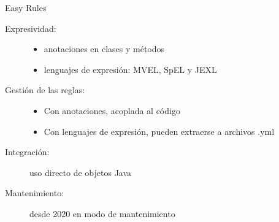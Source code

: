 \documentclass[10pt]{beamer}
\begin{document}
\begin{frame}{Easy Rules}
    \begin{description}
        \item [Expresividad:]
            \begin{itemize}
                \item anotaciones en clases y métodos
                \item lenguajes de expresión: MVEL, SpEL y JEXL
            \end{itemize}
        \item [Gestión de las reglas:]
            \begin{itemize}
                \item Con anotaciones, acoplada al código
                \item Con lenguajes de expresión, pueden extraerse a archivos .yml
            \end{itemize}
        \item [Integración:] uso directo de objetos Java
        \item [Mantenimiento:] desde 2020 en modo de mantenimiento
    \end{description}
\end{frame}

\end{document}
